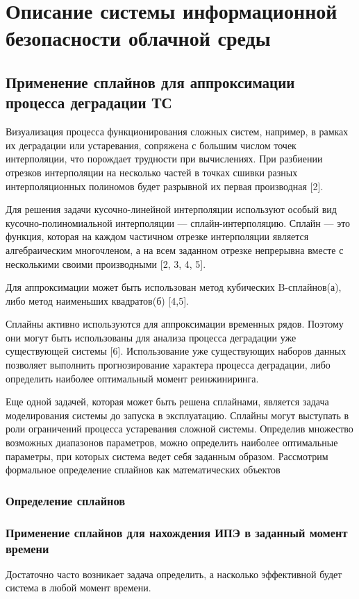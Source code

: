 \section{Описание системы информационной безопасности облачной среды}

\subsection{Применение сплайнов для аппроксимации процесса деградации ТС}
Визуализация процесса функционирования сложных систем, например, в рамках их деградации или устаревания, сопряжена с большим числом точек интерполяции, что порождает трудности при вычислениях. 
При разбиении отрезков интерполяции на несколько частей в точках сшивки разных интерполяционных полиномов будет разрывной их первая производная [2]. 

Для решения задачи кусочно-линейной интерполяции используют особый вид кусочно-полиномиальной интерполяции — сплайн-интерполяцию. 
Сплайн — это функция, которая на каждом частичном отрезке интерполяции является алгебраическим многочленом, а на всем заданном отрезке непрерывна вместе с несколькими своими производными [2, 3, 4, 5].

Для аппроксимации может быть использован метод кубических B-сплайнов(а), либо метод наименьших квадратов(б) [4,5].

Сплайны активно используются для аппроксимации временных рядов. 
Поэтому они могут быть использованы для анализа процесса деградации уже существующей системы [6]. 
Использование уже существующих наборов данных позволяет выполнить прогнозирование характера процесса деградации, либо определить наиболее оптимальный момент реинжиниринга.

Еще одной задачей, которая может быть решена сплайнами, является задача моделирования системы до запуска в эксплуатацию. 
Сплайны могут выступать в роли ограничений процесса устаревания сложной системы. 
Определив множество возможных диапазонов параметров, можно определить наиболее оптимальные параметры, при которых система ведет себя заданным образом.
Рассмотрим формальное определение сплайнов как математических объектов

\subsubsection{Определение сплайнов}

\subsubsection{Применение сплайнов для нахождения ИПЭ в заданный момент времени}
Достаточно часто возникает задача определить, а насколько эффективной будет система в любой момент времени. 

